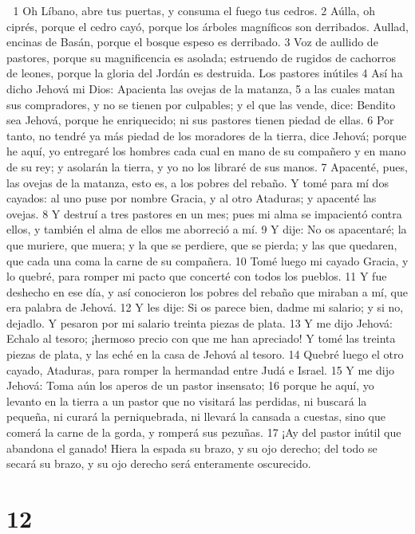 
1 Oh Líbano, abre tus puertas, y consuma el fuego tus cedros.
2 Aúlla, oh ciprés, porque el cedro cayó, porque los árboles magníficos son derribados. Aullad, encinas de Basán, porque el bosque espeso es derribado.
3 Voz de aullido de pastores, porque su magnificencia es asolada; estruendo de rugidos de cachorros de leones, porque la gloria del Jordán es destruida.
Los pastores inútiles
4 Así ha dicho Jehová mi Dios: Apacienta las ovejas de la matanza,
5 a las cuales matan sus compradores, y no se tienen por culpables; y el que las vende, dice: Bendito sea Jehová, porque he enriquecido; ni sus pastores tienen piedad de ellas.
6 Por tanto, no tendré ya más piedad de los moradores de la tierra, dice Jehová; porque he aquí, yo entregaré los hombres cada cual en mano de su compañero y en mano de su rey; y asolarán la tierra, y yo no los libraré de sus manos.
7 Apacenté, pues, las ovejas de la matanza, esto es, a los pobres del rebaño. Y tomé para mí dos cayados: al uno puse por nombre Gracia, y al otro Ataduras; y apacenté las ovejas.
8 Y destruí a tres pastores en un mes; pues mi alma se impacientó contra ellos, y también el alma de ellos me aborreció a mí.
9 Y dije: No os apacentaré; la que muriere, que muera; y la que se perdiere, que se pierda; y las que quedaren, que cada una coma la carne de su compañera.
10 Tomé luego mi cayado Gracia, y lo quebré, para romper mi pacto que concerté con todos los pueblos.
11 Y fue deshecho en ese día, y así conocieron los pobres del rebaño que miraban a mí, que era palabra de Jehová.
12 Y les dije: Si os parece bien, dadme mi salario; y si no, dejadlo. Y pesaron por mi salario treinta piezas de plata.
13 Y me dijo Jehová: Echalo al tesoro; ¡hermoso precio con que me han apreciado! Y tomé las treinta piezas de plata, y las eché en la casa de Jehová al tesoro. 
14 Quebré luego el otro cayado, Ataduras, para romper la hermandad entre Judá e Israel.
15 Y me dijo Jehová: Toma aún los aperos de un pastor insensato;
16 porque he aquí, yo levanto en la tierra a un pastor que no visitará las perdidas, ni buscará la pequeña, ni curará la perniquebrada, ni llevará la cansada a cuestas, sino que comerá la carne de la gorda, y romperá sus pezuñas.
17 ¡Ay del pastor inútil que abandona el ganado! Hiera la espada su brazo, y su ojo derecho; del todo se secará su brazo, y su ojo derecho será enteramente oscurecido.

\chapter{12}

